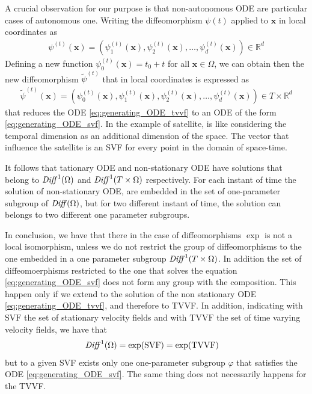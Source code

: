 A crucial observation for our purpose is that non-autonomous ODE are particular cases of autonomous one. Writing the diffeomorphism $\psi(t)$ applied to $\mathbf{x}$ in local coordinates as 
\begin{align*}
\psi^{(t)}(\mathbf{x}) = (\psi_1^{(t)}(\mathbf{x}), \psi_2^{(t)}(\mathbf{x}), \dots ,\psi_d^{(t)}(\mathbf{x})) \in \mathbb{R}^{d}
\end{align*}
Defining a new function $\psi_0^{(t)}(\mathbf{x}) = t_0 + t$ for all $\mathbf{x} \in \Omega$, we can obtain then the new diffeomorphism $\tilde{\psi}^{(t)}$ that in local coordinates is expressed as 
\begin{align*}
\tilde{\psi}^{(t)}(\mathbf{x}) = (\psi_0^{(t)}(\mathbf{x}), \psi_1^{(t)}(\mathbf{x}), \psi_2^{(t)}(\mathbf{x}), \dots ,\psi_d^{(t)}(\mathbf{x})) \in T\times \mathbb{R}^{d}
\end{align*}
that reduces the ODE \ref{eq:generating_ODE_tvvf} to an ODE of the form \ref{eq:generating_ODE_svf}. In the example of satellite, is like considering the temporal dimension as an additional dimension of the space. The vector that influence the satellite is an SVF for every point in the domain of space-time. 

It follows that tationary ODE and non-stationary ODE have solutions that belong to $\text{\emph{Diff}}^{1}(\Omega)$ and $\text{\emph{Diff}}^{1}(T\times \Omega)$ respectively. For each instant of time the solution of non-stationary ODE, are embedded in the set of one-parameter subgroup of $\text{\emph{Diff}}(\Omega)$, but for two different instant of time, the solution can belongs to two different one parameter subgroups. 

In conclusion, we have that there in the case of diffeomorphisms $\exp$ is not a local isomorphism, unless we do not restrict the group of diffeomorphisms to the one embedded in a one parameter subgroup $\text{\emph{Diff}}^{1}(T\times \Omega)$. In addition the set of diffeomoerphisms restricted to the one that solves the equation \ref{eq:generating_ODE_svf} does not form any group with the composition. This happen only if we extend to the solution of the non stationary ODE \ref{eq:generating_ODE_tvvf}, and therefore to TVVF. In addition, indicating with $\text{SVF}$ the set of stationary velocity fields and with $\text{TVVF}$ the set of time varying velocity fields, we have that
\begin{align*}
\text{\emph{Diff}}^{1}(\Omega) &= \exp(\text{SVF}) = \exp(\text{TVVF})
\end{align*}
but to a given SVF exists only one one-parameter subgroup $\varphi$ that satisfies the ODE \ref{eq:generating_ODE_svf}. The same thing does not necessarily happens for the TVVF.

